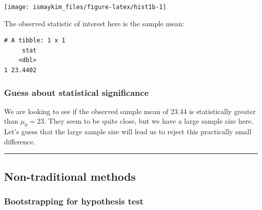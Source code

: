 \documentclass[12pt, krantz2,]{krantz}
\makeatletter
\newenvironment{Shaded}{\begin{snugshade}}{\end{snugshade}}
\newcommand{\DataTypeTok}[1]{\textcolor[rgb]{0.27,0.27,0.27}{#1}}
\newcommand{\KeywordTok}[1]{\textcolor[rgb]{0.27,0.27,0.27}{\textbf{#1}}}
\newcommand{\NormalTok}[1]{#1}
\newcommand{\OperatorTok}[1]{\textcolor[rgb]{0.43,0.43,0.43}{\textbf{#1}}}
\newcommand{\StringTok}[1]{\textcolor[rgb]{0.5,0.5,0.5}{#1}}
\newenvironment{kframe}{%
\medskip{}
\setlength{\fboxsep}{.8em}
 \def\at@end@of@kframe{}%
 \ifinner\ifhmode%
  \def\at@end@of@kframe{\end{minipage}}%
  \begin{minipage}{\columnwidth}%
 \fi\fi%
 \def\FrameCommand##1{\hskip\@totalleftmargin \hskip-\fboxsep
 \colorbox{shadecolor}{##1}\hskip-\fboxsep
     \hskip-\linewidth \hskip-\@totalleftmargin \hskip\columnwidth}%
 \MakeFramed {\advance\hsize-\width
   \@totalleftmargin\z@ \linewidth\hsize
   \@setminipage}}%
 {\par\unskip\endMakeFramed%
 \at@end@of@kframe}
\renewenvironment{Shaded}{\begin{kframe}}{\end{kframe}}
\makeatother
\begin{document}
\begin{center}\texttt{[image: ismaykim\_files/figure-latex/hist1b-1]} \end{center}

The observed statistic of interest here is the sample mean:

\begin{Shaded}
\end{Shaded}

\begin{verbatim}
# A tibble: 1 x 1
     stat
    <dbl>
1 23.4402
\end{verbatim}

\hypertarget{guess-about-statistical-significance}{%
\subsubsection*{Guess about statistical significance}\label{guess-about-statistical-significance}}


We are looking to see if the observed sample mean of 23.44 is statistically greater than \(\mu_0 = 23\). They seem to be quite close, but we have a large sample size here. Let's guess that the large sample size will lead us to reject this practically small difference.

\begin{center}\rule{0.5\linewidth}{\linethickness}\end{center}

\hypertarget{non-traditional-methods}{%
\subsection{Non-traditional methods}\label{non-traditional-methods}}

\hypertarget{bootstrapping-for-hypothesis-test}{%
\subsubsection*{Bootstrapping for hypothesis test}\label{bootstrapping-for-hypothesis-test}}
\end{document}
